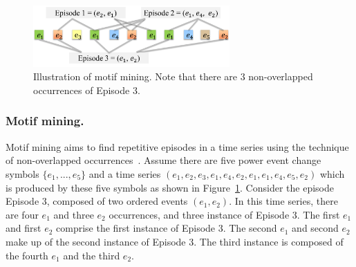 \begin{figure}[!hbtp]
        \centering
\includegraphics[width=0.67\textwidth]{disaggfigs/motifSample.png}
        \caption{Illustration of motif mining. Note that there are 3 non-overlapped
occurrences of Episode 3.}
        \label{fig_motifsample}
\end{figure}


\subsubsection*{Motif mining.} Motif mining aims to find repetitive
episodes in a time series using the technique of non-overlapped
occurrences~\cite{vatsan-paper}. Assume
there are five power event change symbols \begin{math} \{e_1, ..., e_5\} \end{math}
and a time series \begin{math} (e_1, e_2, e_3, e_1, e_4, e_2, e_1, e_1, e_4, e_5, e_2) \end{math}
which is produced by these five symbols as shown in Figure~\ref{fig_motifsample}.
Consider the episode Episode 3, composed of
two ordered events $(e_1, e_2)$.
In this time series, there are four \begin{math}e_1 \end{math} and
three \begin{math}e_2 \end{math} occurrences, and three instance of Episode 3.
The first \begin{math} e_1 \end{math} and first \begin{math} e_2 \end{math} comprise
the first instance of Episode 3.
The second \begin{math}e_1 \end{math} and second \begin{math}e_2 \end{math} make up
of the second instance of Episode 3.
The third instance is composed of the fourth \begin{math} e_1 \end{math} and
the third \begin{math} e_2 \end{math}.
